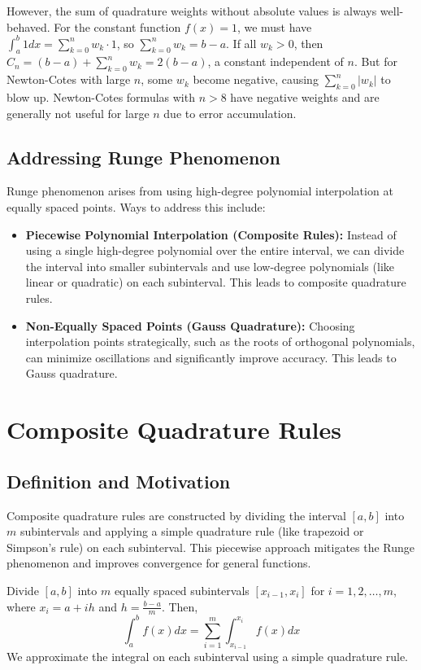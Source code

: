 \documentclass{article}
\begin{document}
However, the sum of quadrature weights without absolute values is always well-behaved. For the constant function $f(x) = 1$, we must have $\int_a^b 1 dx = \sum_{k=0}^n w_k \cdot 1$, so $\sum_{k=0}^n w_k = b-a$.  If all $w_k > 0$, then $C_n = (b-a) + \sum_{k=0}^n w_k = 2(b-a)$, a constant independent of $n$. But for Newton-Cotes with large $n$, some $w_k$ become negative, causing $\sum_{k=0}^n |w_k|$ to blow up. Newton-Cotes formulas with $n > 8$ have negative weights and are generally not useful for large $n$ due to error accumulation.

\subsection{Addressing Runge Phenomenon}
Runge phenomenon arises from using high-degree polynomial interpolation at equally spaced points. Ways to address this include:
\begin{itemize}
    \item \textbf{Piecewise Polynomial Interpolation (Composite Rules):} Instead of using a single high-degree polynomial over the entire interval, we can divide the interval into smaller subintervals and use low-degree polynomials (like linear or quadratic) on each subinterval. This leads to composite quadrature rules.
    \item \textbf{Non-Equally Spaced Points (Gauss Quadrature):} Choosing interpolation points strategically, such as the roots of orthogonal polynomials, can minimize oscillations and significantly improve accuracy. This leads to Gauss quadrature.
\end{itemize}

\section{Composite Quadrature Rules}

\subsection{Definition and Motivation}

Composite quadrature rules are constructed by dividing the interval $[a, b]$ into $m$ subintervals and applying a simple quadrature rule (like trapezoid or Simpson's rule) on each subinterval. This piecewise approach mitigates the Runge phenomenon and improves convergence for general functions.

Divide $[a, b]$ into $m$ equally spaced subintervals $[x_{i-1}, x_i]$ for $i = 1, 2, \dots, m$, where $x_i = a + ih$ and $h = \frac{b-a}{m}$. Then,
\[
\int_a^b f(x) dx = \sum_{i=1}^m \int_{x_{i-1}}^{x_i} f(x) dx
\]
We approximate the integral on each subinterval using a simple quadrature rule.
\end{document}
